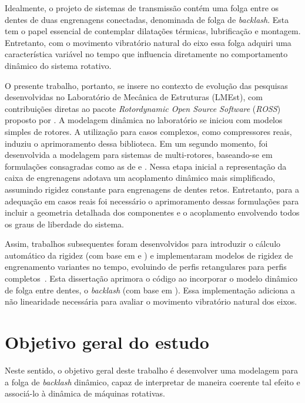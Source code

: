 Idealmente, o projeto de sistemas de transmissão contém uma folga entre os dentes de duas engrenagens conectadas, denominada de folga de \textit{backlash}. Esta tem o papel essencial de contemplar dilatações térmicas, lubrificação e montagem. Entretanto, com o movimento vibratório natural do eixo essa folga adquiri uma característica variável no tempo que influencia diretamente no comportamento dinâmico do sistema rotativo.

O presente trabalho, portanto, se insere no contexto de evolução das pesquisas desenvolvidas no Laboratório de Mecânica de Estruturas (LMEst), com contribuições diretas ao pacote \textit{Rotordynamic Open Source Software} (\textit{ROSS}) proposto por \cite{timbo2020}. A modelagem dinâmica no laboratório se iniciou com modelos simples de rotores. A utilização para casos complexos, como compressores reais, induziu o aprimoramento dessa biblioteca. Em um segundo momento, foi desenvolvida a modelagem para sistemas de multi-rotores, baseando-se em formulações consagradas como as de  e . Nessa etapa inicial a representação da caixa de engrenagens adotava um acoplamento dinâmico mais simplificado, assumindo rigidez constante para engrenagens de dentes retos. Entretanto, para a adequação em casos reais foi necessário o aprimoramento dessas formulações para incluir a geometria detalhada dos componentes e o acoplamento envolvendo todos os graus de liberdade do sistema.

Assim, trabalhos subsequentes foram desenvolvidos para introduzir o cálculo automático da rigidez (com base em  e ) e implementaram modelos de rigidez de engrenamento variantes no tempo, evoluindo de perfis retangulares para perfis completos~\cite{lais2022, ma2014}. Esta dissertação aprimora o código ao incorporar o modelo dinâmico de folga entre dentes, o \textit{backlash} (com base em ). Essa implementação adiciona a não linearidade necessária para avaliar o movimento vibratório natural dos eixos.

\newpage
\section{Objetivo geral do estudo}

Neste sentido, o objetivo geral deste trabalho é desenvolver uma modelagem para a folga de \textit{backlash} dinâmico, capaz de interpretar de maneira coerente tal efeito e associá-lo à dinâmica de máquinas rotativas. 

